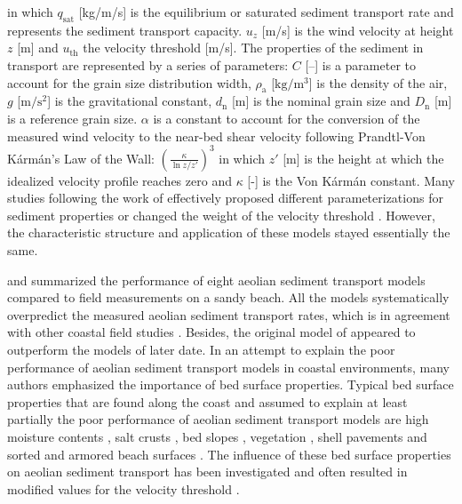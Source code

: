 \noindent in which $q_{\mathrm{sat}}$ [kg/m/s] is the equilibrium or
saturated sediment transport rate and represents the sediment
transport capacity. $u_z$ [m/s] is the wind velocity at height $z$ [m]
and $u_{\mathrm{th}}$ the velocity threshold [m/s]. The properties of
the sediment in transport are represented by a series of parameters:
$C$ [--] is a parameter to account for the grain size distribution
width, $\rho_{\mathrm{a}}$ [$\mathrm{kg/m^3}$] is the density of the
air, $g$ [$\mathrm{m/s^2}$] is the gravitational constant,
$d_{\mathrm{n}}$ [m] is the nominal grain size and $D_{\mathrm{n}}$
[m] is a reference grain size. $\alpha$ is a constant to account for
the conversion of the measured wind velocity to the near-bed shear
velocity following Prandtl-Von K{\'a}rm{\'a}n's Law of the Wall:
$\left(\frac{\kappa}{\ln z / z'} \right)^3$ in which $z'$ [m] is the
height at which the idealized velocity profile reaches zero and
$\kappa$ [-] is the Von K{\'a}rm{\'a}n constant. Many studies
following the work of \citet{Bagnold1937a} effectively proposed
different parameterizations for sediment properties
\citep[e.g.][]{Owen1964, Hsu1971, Sorensen2004} or changed the weight
of the velocity threshold \citep[e.g.][]{Kawamura1951,
  Lettau1978}. However, the characteristic structure and application
of these models stayed essentially the same.

\citet{Sherman1998} and \citet{Sherman2012} summarized the performance
of eight aeolian sediment transport models compared to field
measurements on a sandy beach. All the models systematically
overpredict the measured aeolian sediment transport rates, which is in
agreement with other coastal field studies \citep[e.g.][]{Jackson1999,
  Lynch2008, DavidsonArnott2009, Aagaard2014}. Besides, the original
model of \citet{Bagnold1937a} appeared to outperform the models of
later date. In an attempt to explain the poor performance of aeolian
sediment transport models in coastal environments, many authors
emphasized the importance of bed surface properties. Typical bed
surface properties that are found along the coast and assumed to
explain at least partially the poor performance of aeolian sediment
transport models are high moisture contents \citep[e.g.][]{Wiggs2004,
  DavidsonArnott2008, Darke2008, McKennaNeuman2008, Udo2008,
  Bauer2009, Edwards2009, Namikas2010, Scheidt2010}, salt crusts
\citep[e.g.][]{Nickling1981}, bed slopes \citep[e.g.][]{Iversen2006},
vegetation \citep[e.g.][]{Arens1996, Lancaster1998, Okin2008, Li2013,
  Dupont2014}, shell pavements \citep[e.g.][]{VanDerWal1998,
  McKennaNeuman2012} and sorted and armored beach surfaces
\citep[e.g.][]{Gillette1989, Gillies2006, Tan2013, Cheng2015}. The
influence of these bed surface properties on aeolian sediment
transport has been investigated and often resulted in modified values
for the velocity threshold \citep[e.g.][]{Howard1977, Dyer1986,
  Belly1964, Johnson1965, Hotta1984, Nickling1981, Arens1996,
  King2005}.


